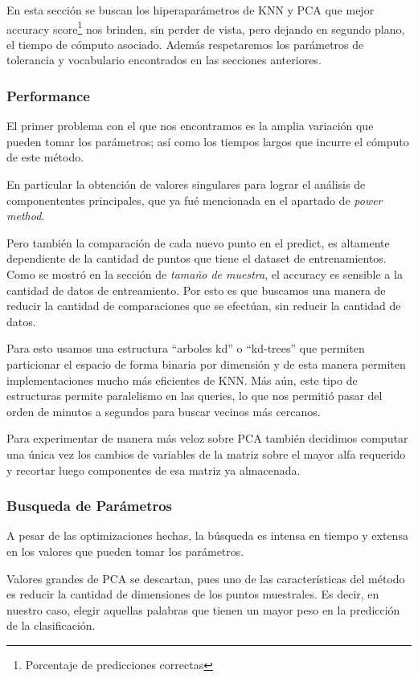 En esta sección se buscan los hiperaparámetros de KNN y PCA que mejor
accuracy score\footnote{Porcentaje de predicciones correctas} nos brinden, sin perder de vista, pero dejando en segundo
plano, el tiempo de cómputo asociado. Además respetaremos los
parámetros de tolerancia y vocabulario encontrados en las secciones
anteriores.

\subsubsection{Performance}

El primer problema con el que nos encontramos es la amplia variación
que pueden tomar los parámetros; así como los tiempos largos que
incurre el cómputo de este método.

En particular la obtención de valores singulares para lograr el
análisis de componententes principales, que ya fué mencionada en el
apartado de \emph{power method}.

Pero también la comparación de cada nuevo punto en el predict, es
altamente dependiente de la cantidad de puntos que tiene el dataset de
entrenamientos. Como se mostró en la sección de \emph{tamaño de
  muestra}, el accuracy es sensible a la cantidad de datos de
entreamiento. Por esto es que buscamos una manera de reducir la
cantidad de comparaciones que se efectúan, sin reducir la cantidad de
datos.

Para esto usamos una estructura ``arboles kd'' o ``kd-trees'' que
permiten particionar el espacio de forma binaria por dimensión y de
esta manera permiten implementaciones mucho más eficientes de KNN. Más aún, este
tipo de estructuras permite paralelismo en las queries, lo que nos permitió
pasar del orden de minutos a segundos para buscar vecinos más cercanos.

Para experimentar de manera más veloz sobre PCA también decidimos computar una
única vez los cambios de variables de la matriz sobre el mayor alfa requerido
y recortar luego componentes de esa matriz ya almacenada.

\subsubsection{Busqueda de Parámetros}

A pesar de las optimizaciones hechas, la búsqueda es intensa en tiempo
y extensa en los valores que pueden tomar los parámetros.

Valores grandes de PCA se descartan, pues uno de las características
del método es reducir la cantidad de dimensiones de los puntos
muestrales. Es decir, en nuestro caso, elegir aquellas palabras que
tienen un mayor peso en la predicción de la clasificación.

